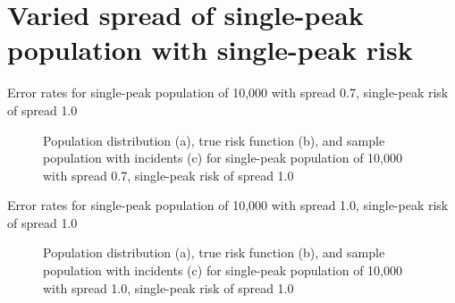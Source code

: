 \section{Varied spread of single-peak population with single-peak risk}
\label{sec:app:results_pX_100_1.0_1h}

\graphicspath{{./results/p0.7_100_1.0_1h/}}
\makeatletter
{}
\makeatother

\begin{table}[H]
    
    \caption[]{Error rates for single-peak population of 10,000 with \gls{spread} 0.7, single-peak risk of \gls{spread} 1.0}
    \label{tab:mean_error_rates:p0.7_100_1.0_1h}
\end{table}

\begin{figure}[H]
    
    \caption[]{Population distribution (a), true risk function (b), and sample population with incidents (c) for single-peak population of 10,000 with \gls{spread} 0.7, single-peak risk of \gls{spread} 1.0}
    \label{fig:distributions:p0.7_100_1.0_1h}    
\end{figure}

\graphicspath{{./results/p1.0_100_1.0_1h/}}
\makeatletter
{}
\makeatother

\begin{table}[H]
    
    \caption[]{Error rates for single-peak population of 10,000 with \gls{spread} 1.0, single-peak risk of \gls{spread} 1.0}
    \label{tab:mean_error_rates:p1.0_100_1.0_1h}
\end{table}

\begin{figure}[H]
    
    \caption[]{Population distribution (a), true risk function (b), and sample population with incidents (c) for single-peak population of 10,000 with \gls{spread} 1.0, single-peak risk of \gls{spread} 1.0}
    \label{fig:distributions:p1.0_100_1.0_1h}    
\end{figure}

\graphicspath{{./results/p1.4_100_1.0_1h/}}
\makeatletter
{}
\makeatother

